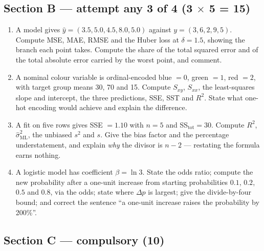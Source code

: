 \documentclass[11pt,a4paper]{article}
\begin{document}
\subsection*{Section B --- attempt any 3 of 4 \quad (3 $\times$ 5 = 15)}

\begin{enumerate}[label=\textbf{\arabic*.}, leftmargin=*, start=6]
\item A model gives $\hat y = (3.5, 5.0, 4.5, 8.0, 5.0)$ against
  $y = (3, 6, 2, 9, 5)$. Compute MSE, MAE, RMSE and the Huber loss at
  $\delta = 1.5$, showing the branch each point takes. Compute the share of the
  total squared error and of the total absolute error carried by the worst
  point, and comment. 
\item A nominal colour variable is ordinal-encoded blue $=0$, green $=1$,
  red $=2$, with target group means 30, 70 and 15. Compute $S_{xy}$, $S_{xx}$,
  the least-squares slope and intercept, the three predictions, SSE, SST and
  $R^2$. State what one-hot encoding would achieve and explain the difference.
\item A fit on five rows gives SSE $= 1.10$ with $n = 5$ and
  SS$_{\text{tot}} = 30$. Compute $R^2$, $\hat\sigma^2_{\text{ML}}$, the
  unbiased $s^2$ and $s$. Give the bias factor and the percentage
  understatement, and explain \emph{why} the divisor is $n-2$ --- restating
  the formula earns nothing. 
\item A logistic model has coefficient $\beta = \ln 3$. State the odds ratio;
  compute the new probability after a one-unit increase from starting
  probabilities $0.1$, $0.2$, $0.5$ and $0.8$, via the odds; state where
  $\Delta p$ is largest; give the divide-by-four bound; and correct the
  sentence ``a one-unit increase raises the probability by 200\%''. 
\end{enumerate}

\subsection*{Section C --- compulsory \quad (10)}
\end{document}
